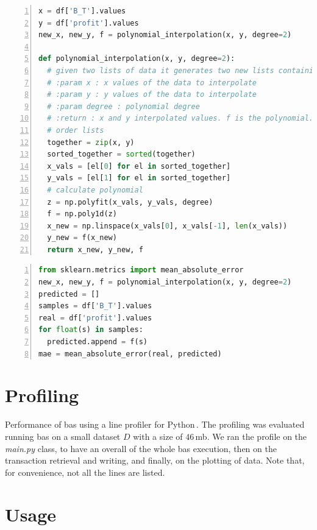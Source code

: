 \documentclass[USenglish]{uit-thesis}
\begin{document}
\begin{appendices}
\begin{lstlisting}[float, numbers=left,frame=single,caption={Polynomial interpolation on miner's profit, $\langle \Pi \rangle$, and creation time, $\mathcal{T}$, using Numpy libraries.},language=Python]
x = df['B_T'].values
y = df['profit'].values
new_x, new_y, f = polynomial_interpolation(x, y, degree=2)

def polynomial_interpolation(x, y, degree=2):
  # given two lists of data it generates two new lists containing the y values interpolated
  # :param x : x values of the data to interpolate
  # :param y : y values of the data to interpolate
  # :param degree : polynomial degree
  # :return : x and y interpolated values. f is the polynomial.
  # order lists
  together = zip(x, y)
  sorted_together = sorted(together)
  x_vals = [el[0] for el in sorted_together]
  y_vals = [el[1] for el in sorted_together]
  # calculate polynomial
  z = np.polyfit(x_vals, y_vals, degree)
  f = np.poly1d(z)
  x_new = np.linspace(x_vals[0], x_vals[-1], len(x_vals))
  y_new = f(x_new)
  return x_new, y_new, f
\end{lstlisting}





\begin{lstlisting}[float, numbers=left,frame=single,caption={\gls{mae} accuracy calculation on miner's profit $\langle \Pi \rangle$ calculated using scikit-learn libraries in Python.},language=Python]
from sklearn.metrics import mean_absolute_error
new_x, new_y, f = polynomial_interpolation(x, y, degree=2)
predicted = []
samples = df['B_T'].values
real = df['profit'].values
for float(s) in samples:
  predicted.append = f(s)
mae = mean_absolute_error(real, predicted)
\end{lstlisting}

\chapter{Profiling}
\label{app:profiling}
Performance of \gls{bas} using a line profiler for Python\,\cite{line_profiler}.
The profiling was evaluated running \gls{bas} on a small dataset $D$
with a size of $46$\,\gls{mb}.
We ran the profile on the \emph{main.py} class, to have an overall of the whole
\gls{bas} execution, then on the transaction retrieval
and writing, and finally, on the plotting of data.
Note that, for convenience, not all the lines are listed.







\chapter{Usage}
\label{app:usage}


\end{appendices}



\backmatter
\end{document}
